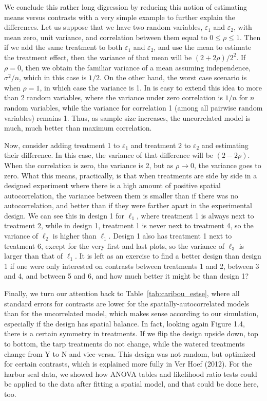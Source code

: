 \documentclass[12pt, titlepage]{article}
\begin{document}
We conclude this rather long digression by reducing this notion of estimating means versus contrasts with a very simple example to further explain the differences.  Let us suppose that we have two random variables, $\varepsilon_{1}$ and $\varepsilon_{2}$, with mean zero, unit variance, and correlation between them equal to $0 \le \rho \le 1$.  Then if we add the same treatment to both $\varepsilon_{1}$ and $\varepsilon_{2}$, and use the mean to estimate the treatment effect, then the variance of that mean will be $(2 + 2\rho)/2^{2}$.  If $\rho = 0$, then we obtain the familiar variance of a mean assuming independence, $\sigma^{2}/n$, which in this case is $1/2$.  On the other hand, the worst case scenario is when $\rho = 1$, in which case the variance is 1.  In is easy to extend this idea to more than 2 random variables, where the variance under zero correlation is $1/n$ for $n$ random variables, while the variance for correlation 1 (among all pairwise random variables) remains 1.  Thus, as sample size increases, the uncorrelated model is much, much better than maximum correlation.  

Now, consider adding treatment 1 to $\varepsilon_{1}$ and treatment 2 to $\varepsilon_{2}$ and estimating their difference.  In this case, the variance of that difference will be $(2 - 2\rho)$.  When the correlation is zero, the variance is 2, but as $\rho \rightarrow 0$, the variance goes to zero.  What this means, practically, is that when treatments are side by side in a designed experiment where there is a high amount of positive spatial autocorrelation, the variance between them is smaller than if there was no autocorrelation, and better than if they were farther apart in the experimental design.  We can see this in design 1 for $\ell_{1}$, where treatment 1 is always next to treatment 2, while in design 1, treatment 1 is never next to treatment 4, so the variance of $\ell_{2}$ is higher than $\ell_{1}$.  Design 1 also has treatment 1 next to treatment 6, except for the very first and last plots, so the variance of $\ell_{3}$ is larger than that of $\ell_{1}$.  It is left as an exercise to find a better design than design 1 if one were only interested on contrasts between treatments 1 and 2, between 3 and 4, and between 5 and 6, and how much better it might be than design 1?

Finally, we turn our attention back to Table~\ref{tab:caribou_estse}, where all standard errors for contrasts are lower for the spatially-autocorrelated models than for the uncorrelated model, which makes sense according to our simulation, especially if the design has spatial balance.  In fact, looking again Figure 1.4, there is a certain symmetry in treatments.  If we flip the design upside down, top to bottom, the tarp treatments do not change, while the watered treatments change from Y to N and vice-versa.  This design was not random, but optimized for certain contrasts, which is explained more fully in Ver Hoef (2012).  For the harbor seal data, we showed how ANOVA tables and likelihood ratio tests could be applied to the data after fitting a spatial model, and that could be done here, too.  
\end{document}
